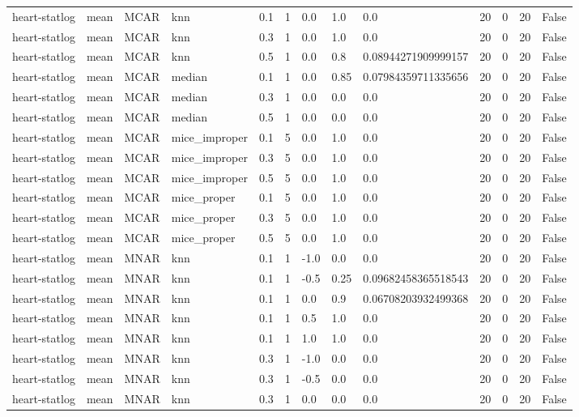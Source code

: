 \begin{tabular}{lllllllllllll}
heart-statlog & mean & MCAR & knn & 0.1 & 1 & 0.0 & 1.0 & 0.0 & 20 & 0 & 20 & False \\
heart-statlog & mean & MCAR & knn & 0.3 & 1 & 0.0 & 1.0 & 0.0 & 20 & 0 & 20 & False \\
heart-statlog & mean & MCAR & knn & 0.5 & 1 & 0.0 & 0.8 & 0.08944271909999157 & 20 & 0 & 20 & False \\
heart-statlog & mean & MCAR & median & 0.1 & 1 & 0.0 & 0.85 & 0.07984359711335656 & 20 & 0 & 20 & False \\
heart-statlog & mean & MCAR & median & 0.3 & 1 & 0.0 & 0.0 & 0.0 & 20 & 0 & 20 & False \\
heart-statlog & mean & MCAR & median & 0.5 & 1 & 0.0 & 0.0 & 0.0 & 20 & 0 & 20 & False \\
heart-statlog & mean & MCAR & mice\_improper & 0.1 & 5 & 0.0 & 1.0 & 0.0 & 20 & 0 & 20 & False \\
heart-statlog & mean & MCAR & mice\_improper & 0.3 & 5 & 0.0 & 1.0 & 0.0 & 20 & 0 & 20 & False \\
heart-statlog & mean & MCAR & mice\_improper & 0.5 & 5 & 0.0 & 1.0 & 0.0 & 20 & 0 & 20 & False \\
heart-statlog & mean & MCAR & mice\_proper & 0.1 & 5 & 0.0 & 1.0 & 0.0 & 20 & 0 & 20 & False \\
heart-statlog & mean & MCAR & mice\_proper & 0.3 & 5 & 0.0 & 1.0 & 0.0 & 20 & 0 & 20 & False \\
heart-statlog & mean & MCAR & mice\_proper & 0.5 & 5 & 0.0 & 1.0 & 0.0 & 20 & 0 & 20 & False \\
heart-statlog & mean & MNAR & knn & 0.1 & 1 & -1.0 & 0.0 & 0.0 & 20 & 0 & 20 & False \\
heart-statlog & mean & MNAR & knn & 0.1 & 1 & -0.5 & 0.25 & 0.09682458365518543 & 20 & 0 & 20 & False \\
heart-statlog & mean & MNAR & knn & 0.1 & 1 & 0.0 & 0.9 & 0.06708203932499368 & 20 & 0 & 20 & False \\
heart-statlog & mean & MNAR & knn & 0.1 & 1 & 0.5 & 1.0 & 0.0 & 20 & 0 & 20 & False \\
heart-statlog & mean & MNAR & knn & 0.1 & 1 & 1.0 & 1.0 & 0.0 & 20 & 0 & 20 & False \\
heart-statlog & mean & MNAR & knn & 0.3 & 1 & -1.0 & 0.0 & 0.0 & 20 & 0 & 20 & False \\
heart-statlog & mean & MNAR & knn & 0.3 & 1 & -0.5 & 0.0 & 0.0 & 20 & 0 & 20 & False \\
heart-statlog & mean & MNAR & knn & 0.3 & 1 & 0.0 & 0.0 & 0.0 & 20 & 0 & 20 & False \\

\end{tabular}

